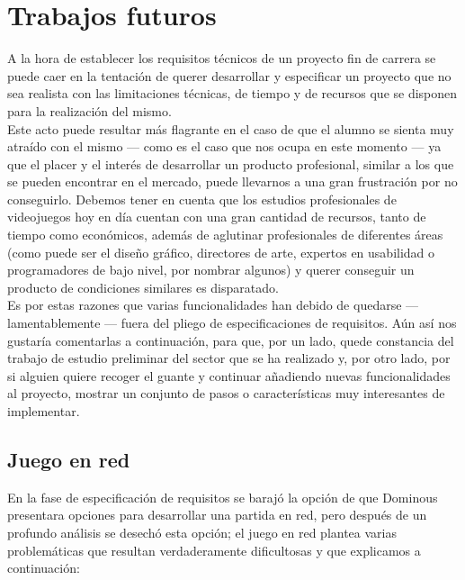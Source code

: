 \section{Trabajos futuros}

A la hora de establecer los requisitos técnicos de un proyecto fin de carrera se puede caer en la tentación de querer desarrollar y
especificar un proyecto que no sea realista con las limitaciones técnicas, de tiempo y de recursos que se disponen para la
realización del mismo. \\

Este acto puede resultar más flagrante en el caso de que el alumno se sienta muy atraído con el mismo --- como es el caso
que nos ocupa en este momento --- ya que el placer y el interés de desarrollar un producto profesional, similar a los que
se pueden encontrar en el mercado, puede llevarnos a una gran frustración por no conseguirlo. Debemos tener en cuenta que
los estudios profesionales de videojuegos hoy en día cuentan con una gran cantidad de recursos, tanto de tiempo como
económicos, además de aglutinar profesionales de diferentes áreas (como puede ser el diseño gráfico, directores de arte,
expertos en usabilidad o programadores de bajo nivel, por nombrar algunos) y querer conseguir un producto de condiciones
similares es disparatado. \\

Es por estas razones que varias funcionalidades han debido de quedarse --- lamentablemente --- fuera del pliego de
especificaciones de requisitos. Aún así nos gustaría comentarlas a continuación, para que, por un lado, quede constancia
del trabajo de estudio preliminar del sector que se ha realizado y, por otro lado, por si alguien quiere recoger
el guante y continuar añadiendo nuevas funcionalidades al proyecto, mostrar un conjunto de pasos o características
muy interesantes de implementar.

\subsection{Juego en red}

En la fase de especificación de requisitos se barajó la opción de que Dominous presentara opciones para desarrollar una
partida en red, pero después de un profundo análisis se desechó esta opción; el juego en red plantea varias problemáticas
que resultan verdaderamente dificultosas y que explicamos a continuación:

